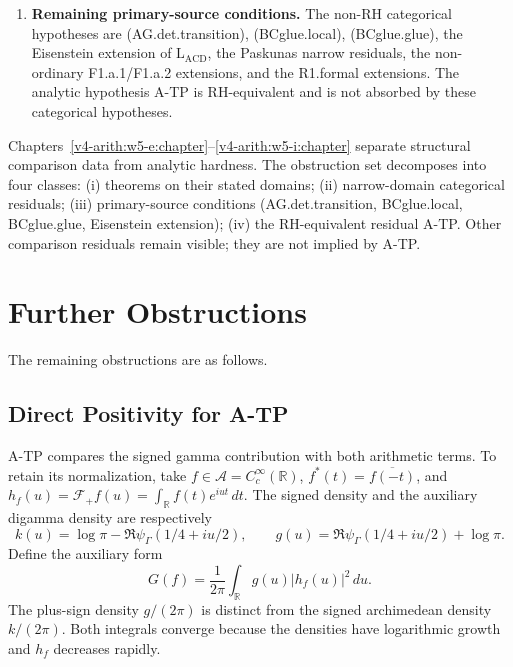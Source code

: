\begin{enumerate}
Chapter~\ref{v4-arith:w5-j:VBstar-spectral-positivity} proves the implication
\(\mathrm{(SH)}+\mathrm{(Det)}+\mathrm{(HB}^{+})+\mathrm{EC}_\pi
\Rightarrow \mathrm{RH}\). The proof of each of the four hypotheses on
\(\xi_{\mathbb{R}}\) lies outside the domain of Chapter~\ref{v4-arith:w5-j:VBstar-spectral-positivity}.
\item \textbf{Remaining primary-source conditions.}
The non-RH categorical hypotheses are (AG.det.transition),
(BCglue.local), (BCglue.glue), the Eisenstein extension of
\(\mathrm{L}_{\mathrm{ACD}}\), the Paskunas narrow residuals, the
non-ordinary F1.a.1/F1.a.2 extensions, and the R1.formal extensions.
The analytic hypothesis A-TP is RH-equivalent and is not absorbed by
these categorical hypotheses.
\end{enumerate}

\begin{remark}
\label{v4-arith:w5-synth:rem:irreducible}
Chapters~\ref{v4-arith:w5-e:chapter}--\ref{v4-arith:w5-i:chapter} separate structural comparison data from analytic hardness.
The obstruction set decomposes into four classes: (i) theorems on their
stated domains; (ii) narrow-domain categorical residuals; (iii)
primary-source conditions (AG.det.transition, BCglue.local,
BCglue.glue, Eisenstein extension); (iv) the RH-equivalent residual
A-TP. Other comparison residuals remain visible; they are not implied
by A-TP.
\end{remark}

\section{Further Obstructions}
\label{v4-arith:w5-synth:path-forward}

The remaining obstructions are as follows.

\subsection{Direct Positivity for A-TP}
\label{v4-arith:w5-synth:direct-ATP}

A-TP compares the signed gamma contribution with both arithmetic
terms. To retain its normalization, take \(f\in\mathscr A=C_c^\infty(\mathbb R)\),
\(f^*(t)=\overline{f(-t)}\), and
\(h_f(u)=\mathcal F_+f(u)=\int_{\mathbb R}f(t)e^{iut}\,dt\).
The signed density and the auxiliary digamma density are respectively
\[
 k(u)=\log\pi-\Re\psi_\Gamma(1/4+iu/2),\qquad
 g(u)=\Re\psi_\Gamma(1/4+iu/2)+\log\pi.
\]
Define the auxiliary form
\[
 G(f)=\frac1{2\pi}\int_{\mathbb R}g(u)|h_f(u)|^2\,du.
\]
The plus-sign density \(g/(2\pi)\) is distinct from the signed
archimedean density \(k/(2\pi)\). Both integrals converge because
the densities have logarithmic growth and \(h_f\) decreases rapidly.

